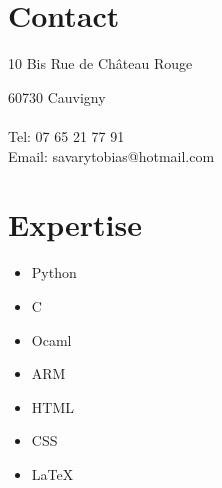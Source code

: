 \documentclass[10pt, oneside, a4paper, titlepage]{article}
\begin{document}
    \begin{tcolorbox}
        \vspace*{0.2cm}
        \hspace*{0.7mm}
        \begin{minipage}[t]{7cm}
            \begin{spacing}{0.95}
            \vspace*{-0.5cm}
            \begin{tcolorbox}[grow to left by = 0.6cm, colback = gray!25, colframe = white]
                
                \section*{\\Contact}
                \hspace*{0.4cm}
                10 Bis Rue de Château Rouge 
                \vspace*{0.2cm}
                
                \hspace*{0.4cm}
                60730 Cauvigny\\ \\
                \hspace*{0.4cm}
                Tel: 07 65 21 77 91\\
                \hspace*{0.4cm}
                Email: savarytobias@hotmail.com\\

                \section*{Expertise}
                \begin{itemize}
                    \item Python
                    \item C
                    \item Ocaml
                    \item ARM
                    \item HTML
                    \item CSS
                    \item \LaTeX
                \end{itemize}
                \vspace*{1mm}

\end{tcolorbox}
\end{spacing}
\end{minipage}
\end{tcolorbox}
\end{document}
